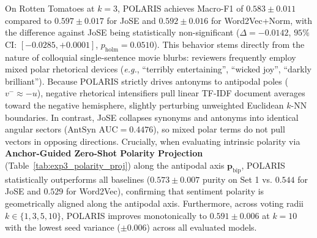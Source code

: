 \documentclass[journal]{IEEEtran}
\begin{document}
On Rotten Tomatoes at $k=3$, POLARIS achieves Macro-F1 of $0.583 \pm 0.011$ compared to $0.597 \pm 0.017$ for JoSE and $0.592 \pm 0.016$ for Word2Vec+Norm, with the difference against JoSE being statistically non-significant ($\Delta = -0.0142$, $95\%$ CI: $[-0.0285, +0.0001]$, $p_{\text{holm}} = 0.0510$). This behavior stems directly from the nature of colloquial single-sentence movie blurbs: reviewers frequently employ mixed polar rhetorical devices (\textit{e.g.}, ``terribly entertaining'', ``wicked joy'', ``darkly brilliant''). Because POLARIS strictly drives antonyms to antipodal poles ($v^- \approx -u$), negative rhetorical intensifiers pull linear TF-IDF document averages toward the negative hemisphere, slightly perturbing unweighted Euclidean $k$-NN boundaries. In contrast, JoSE collapses synonyms and antonyms into identical angular sectors ($\text{AntSyn AUC} = 0.4476$), so mixed polar terms do not pull vectors in opposing directions. Crucially, when evaluating intrinsic polarity via \textbf{Anchor-Guided Zero-Shot Polarity Projection} (Table~\ref{tab:exp3_polarity_proj}) along the antipodal axis $\mathbf{p}_{\text{bip}}$, POLARIS statistically outperforms all baselines ($0.573 \pm 0.007$ purity on Set 1 vs. $0.544$ for JoSE and $0.529$ for Word2Vec), confirming that sentiment polarity is geometrically aligned along the antipodal axis. Furthermore, across voting radii $k \in \{1, 3, 5, 10\}$, POLARIS improves monotonically to $0.591 \pm 0.006$ at $k=10$ with the lowest seed variance ($\pm 0.006$) across all evaluated models.
\end{document}
